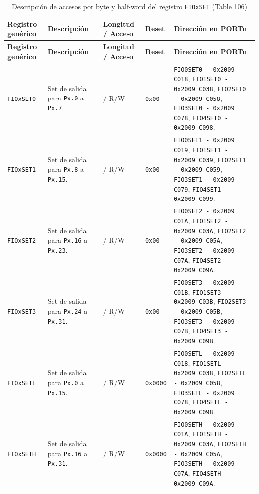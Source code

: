 \begin{longtable}{|>{\raggedright\arraybackslash}p{}|>{\raggedright\arraybackslash}p{}|>{\centering\arraybackslash}p{}|>{\centering\arraybackslash}p{}|>{\raggedright\arraybackslash}p{}|}
\caption{Descripción de accesos por byte y half-word del registro \texttt{FIOxSET} (Table 106)} \\
\hline
\textbf{Registro genérico} & \textbf{Descripción} & \textbf{Longitud / Acceso} & \textbf{Reset} & \textbf{Dirección en PORTn} \\
\hline
\endfirsthead
\hline
\textbf{Registro genérico} & \textbf{Descripción} & \textbf{Longitud / Acceso} & \textbf{Reset} & \textbf{Dirección en PORTn} \\
\hline
\endhead
\texttt{FIOxSET0} & Set de salida para \texttt{Px.0} a \texttt{Px.7}. & 8 / R/W & \texttt{0x00} & \texttt{FIO0SET0 - 0x2009 C018}, \texttt{FIO1SET0 - 0x2009 C038}, \texttt{FIO2SET0 - 0x2009 C058}, \texttt{FIO3SET0 - 0x2009 C078}, \texttt{FIO4SET0 - 0x2009 C098}. \\
\hline
\texttt{FIOxSET1} & Set de salida para \texttt{Px.8} a \texttt{Px.15}. & 8 / R/W & \texttt{0x00} & \texttt{FIO0SET1 - 0x2009 C019}, \texttt{FIO1SET1 - 0x2009 C039}, \texttt{FIO2SET1 - 0x2009 C059}, \texttt{FIO3SET1 - 0x2009 C079}, \texttt{FIO4SET1 - 0x2009 C099}. \\
\hline
\texttt{FIOxSET2} & Set de salida para \texttt{Px.16} a \texttt{Px.23}. & 8 / R/W & \texttt{0x00} & \texttt{FIO0SET2 - 0x2009 C01A}, \texttt{FIO1SET2 - 0x2009 C03A}, \texttt{FIO2SET2 - 0x2009 C05A}, \texttt{FIO3SET2 - 0x2009 C07A}, \texttt{FIO4SET2 - 0x2009 C09A}. \\
\hline
\texttt{FIOxSET3} & Set de salida para \texttt{Px.24} a \texttt{Px.31}. & 8 / R/W & \texttt{0x00} & \texttt{FIO0SET3 - 0x2009 C01B}, \texttt{FIO1SET3 - 0x2009 C03B}, \texttt{FIO2SET3 - 0x2009 C05B}, \texttt{FIO3SET3 - 0x2009 C07B}, \texttt{FIO4SET3 - 0x2009 C09B}. \\
\hline
\texttt{FIOxSETL} & Set de salida para \texttt{Px.0} a \texttt{Px.15}. & 16 / R/W & \texttt{0x0000} & \texttt{FIO0SETL - 0x2009 C018}, \texttt{FIO1SETL - 0x2009 C038}, \texttt{FIO2SETL - 0x2009 C058}, \texttt{FIO3SETL - 0x2009 C078}, \texttt{FIO4SETL - 0x2009 C098}. \\
\hline
\texttt{FIOxSETH} & Set de salida para \texttt{Px.16} a \texttt{Px.31}. & 16 / R/W & \texttt{0x0000} & \texttt{FIO0SETH - 0x2009 C01A}, \texttt{FIO1SETH - 0x2009 C03A}, \texttt{FIO2SETH - 0x2009 C05A}, \texttt{FIO3SETH - 0x2009 C07A}, \texttt{FIO4SETH - 0x2009 C09A}. \\
\hline
\end{longtable}

